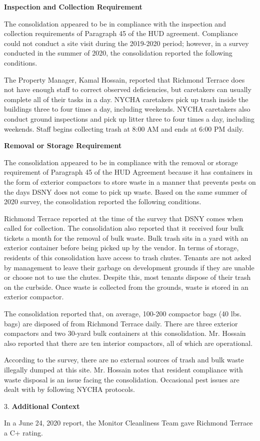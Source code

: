 

\textbf{Inspection and Collection Requirement}

The consolidation appeared to be in compliance with the inspection and collection requirements of Paragraph 45 of the HUD agreement. Compliance could not conduct a site visit during the 2019-2020 period; however, in a survey conducted in the summer of 2020, the consolidation reported the following conditions.

The Property Manager, Kamal Hossain, reported that Richmond Terrace does not have enough staff to correct observed deficiencies, but caretakers can usually complete all of their tasks in a day. NYCHA caretakers pick up trash inside the buildings three to four times a day, including weekends. NYCHA caretakers also conduct ground inspections and pick up litter three to four times a day, including weekends. Staff begins collecting trash at 8:00 AM and ends at 6:00 PM daily.

\textbf{Removal or Storage Requirement}

The consolidation appeared to be in compliance with the  removal or storage requirement of Paragraph  45 of the HUD Agreement because it has containers in the form of exterior compactors to store waste in a manner that prevents pests on the days DSNY does not come to pick up waste. Based on the same summer of  2020 survey, the consolidation reported the following conditions.

Richmond Terrace reported at the time of the survey that DSNY comes when called for collection. The consolidation also reported that it received four bulk tickets a month for the removal of bulk waste. Bulk trash sits in a yard with an exterior container before being picked up by the vendor. In terms of storage, residents of this consolidation have access to trash chutes. Tenants are not asked by management to leave their garbage on development grounds if they are unable or choose not to use the chutes. Despite this, most tenants dispose of their trash on the curbside. Once waste is collected from the grounds, waste is stored in an exterior compactor. 

The consolidation reported that, on average, 100-200 compactor bags (40 lbs. bags) are disposed of from Richmond Terrace daily. There are three exterior compactors and two 30-yard bulk containers at this consolidation. Mr. Hossain also reported that there are ten interior compactors, all of which are operational.  

According to the survey, there are no external sources of trash and bulk waste illegally dumped at this site. Mr. Hossain notes that resident compliance with waste disposal is an issue facing the consolidation. Occasional pest issues are dealt with by following NYCHA protocols. 

3. \textbf{Additional Context} 

In a June 24, 2020 report, the Monitor Cleanliness Team gave Richmond Terrace a C+ rating. 